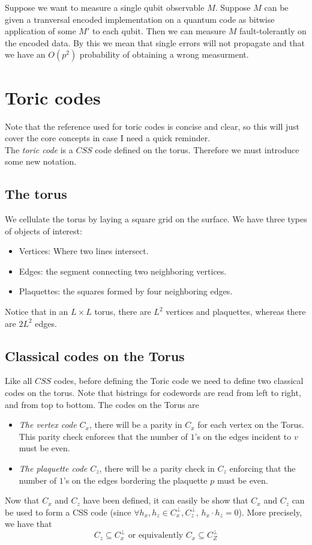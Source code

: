 \documentclass[11pt,a4paper]{article}
\theoremstyle{definition}
\theoremstyle{plain}
\theoremstyle{remark}
\begin{document}
Suppose we want to measure a single qubit observable $M$. Suppose $M$ can be given a tranversal encoded implementation 
on a quantum code as bitwise application of some $M'$ to each qubit. Then we can measure $M$ fault-tolerantly on the 
encoded data. By this we mean that single errors will not propagate and that we have an $O(p^2)$ probability of obtaining a wrong 
measurment. 

\section{Toric codes} 
Note that the reference used for toric codes is concise and clear, so this will just cover the core concepts in 
case I need a quick reminder. \\
The \emph{toric code} is a $CSS$ code defined on the torus. Therefore we must introduce some new notation. 
 
\subsection{The torus} 
We cellulate the torus by laying a square grid on the surface. 
We have three types of objects of interest: 
\begin{itemize}
  \item Vertices: Where two lines intersect. 
  \item Edges: the segment connecting two neighboring vertices. 
  \item Plaquettes: the squares formed by four neighboring edges. 
\end{itemize}
Notice that in an $L \times L$ torus, there are $L^2$ vertices and plaquettes, whereas there 
are $2 L^2$ edges. 

\subsection{Classical codes on the Torus} 
Like all $CSS$ codes, before defining the Toric code we need to define two classical codes on the torus. Note that bistrings for codewords 
are read from left to right, and from top to bottom. The codes on the Torus are
\begin{itemize}
  \item \emph{The vertex code $C_x$}, there will be a parity in $C_x$ for each vertex on the Torus. This parity check enforces 
  that the number of $1$'s on the edges incident to $v$ must be even. 

  \item \emph{The plaquette code $C_z$}, there will be a parity check in $C_z$ enforcing that the 
  number of $1$'s on the edges bordering the plaquette $p$ must be even. 
\end{itemize}
Now that $C_x$ and $C_z$ have been defined, it can easily be show that $C_x$ and $C_z$ can be used 
to form a CSS code (since $\forall h_x, h_z \in C_x^{\perp}, C_z^\perp, \, h_x \cdot h_z = 0$).  
More precisely, we have that 
$$C_z \subseteq C_x^\perp \text{ or equivalently } C_x \subseteq C_Z^\perp$$
\end{document}
